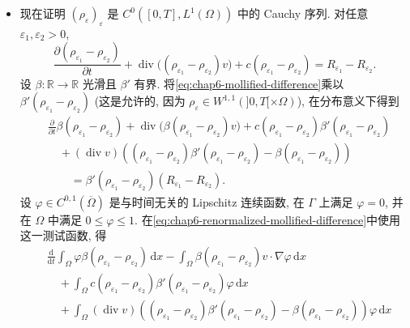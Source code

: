 \begin{sloppypar}
\begin{Proof}
\begin{itemize}
 \item 现在证明 $(\rho_\varepsilon)_\varepsilon$ 是 $C^0([0,T],L^1(\Omega))$ 中的 Cauchy 序列. 对任意 $\varepsilon_1,\varepsilon_2>0$,
 \begin{equation}
  \frac{\partial(\rho_{\varepsilon_1}-\rho_{\varepsilon_2})}{\partial t}
  +\operatorname{div}\bigl((\rho_{\varepsilon_1}-\rho_{\varepsilon_2})v\bigr)
  +c(\rho_{\varepsilon_1}-\rho_{\varepsilon_2})
  =R_{\varepsilon_1}-R_{\varepsilon_2}.
 \label{eq:chap6-mollified-difference}
 \end{equation}
 设 $\beta:\mathbb R\to\mathbb R$ 光滑且 $\beta'$ 有界. 将\eqref{eq:chap6-mollified-difference}乘以 $\beta'(\rho_{\varepsilon_1}-\rho_{\varepsilon_2})$ (这是允许的, 因为 $\rho_\varepsilon\in W^{1,1}(]0,T[\times\Omega)$), 在分布意义下得到
 \begin{equation}
 \begin{aligned}
 &\frac{\partial}{\partial t}\beta(\rho_{\varepsilon_1}-\rho_{\varepsilon_2})
 +\operatorname{div}\bigl(\beta(\rho_{\varepsilon_1}-\rho_{\varepsilon_2})v\bigr)
 +c(\rho_{\varepsilon_1}-\rho_{\varepsilon_2})
 \beta'(\rho_{\varepsilon_1}-\rho_{\varepsilon_2})\\
 &\quad +(\operatorname{div}v)
 \left((\rho_{\varepsilon_1}-\rho_{\varepsilon_2})
 \beta'(\rho_{\varepsilon_1}-\rho_{\varepsilon_2})
 -\beta(\rho_{\varepsilon_1}-\rho_{\varepsilon_2})\right)\\
 &\qquad=\beta'(\rho_{\varepsilon_1}-\rho_{\varepsilon_2})
 (R_{\varepsilon_1}-R_{\varepsilon_2}).
 \end{aligned}
 \label{eq:chap6-renormalized-mollified-difference}
 \end{equation}
 设 $\varphi\in C^{0,1}(\overline\Omega)$ 是与时间无关的 Lipschitz 连续函数, 在 $\Gamma$ 上满足 $\varphi=0$, 并在 $\Omega$ 中满足 $0\leq\varphi\leq1$. 在\eqref{eq:chap6-renormalized-mollified-difference}中使用这一测试函数, 得
 \[
 \begin{aligned}
 &\frac{\mathrm d}{\mathrm dt}\int_\Omega
 \varphi\beta(\rho_{\varepsilon_1}-\rho_{\varepsilon_2})\,\mathrm dx
 -\int_\Omega\beta(\rho_{\varepsilon_1}-\rho_{\varepsilon_2})v\cdot\nabla\varphi\,\mathrm dx\\
 &\quad+\int_\Omega c(\rho_{\varepsilon_1}-\rho_{\varepsilon_2})
 \beta'(\rho_{\varepsilon_1}-\rho_{\varepsilon_2})\varphi\,\mathrm dx\\
 &\quad+\int_\Omega(\operatorname{div}v)
 \left((\rho_{\varepsilon_1}-\rho_{\varepsilon_2})
 \beta'(\rho_{\varepsilon_1}-\rho_{\varepsilon_2})
 -\beta(\rho_{\varepsilon_1}-\rho_{\varepsilon_2})\right)\varphi\,\mathrm dx\\

\end{aligned}\]
\end{itemize}
\end{Proof}
\end{sloppypar}
